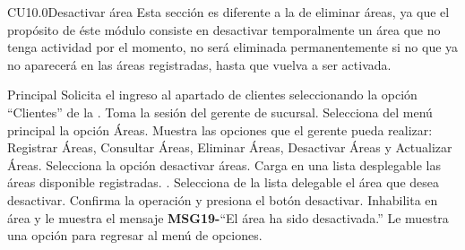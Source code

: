 

	\begin{UseCase}{CU10.0}{Desactivar área}{
		Esta sección es diferente a la de eliminar áreas, ya que el propósito de éste módulo consiste en desactivar temporalmente un área que no tenga actividad por el momento, no será eliminada permanentemente si no que ya no aparecerá en las áreas registradas, hasta que vuelva a ser activada.
	}




	\end{UseCase}

\begin{UCtrayectoria}{Principal}
		\UCpaso[\UCactor] Solicita el ingreso al apartado de clientes seleccionando la opción ``Clientes'' de la .
		\UCpaso Toma la sesión del gerente de sucursal.
		\UCpaso[\UCactor] Selecciona del menú principal la opción Áreas.
		\UCpaso Muestra las opciones que el gerente pueda realizar: Registrar Áreas, Consultar Áreas, Eliminar Áreas, Desactivar Áreas y Actualizar Áreas.
		\UCpaso[\UCactor] Selecciona la opción desactivar áreas.
		\UCpaso Carga en una lista desplegable las áreas disponible registradas. .
		\UCpaso[\UCactor] Selecciona de la lista delegable el área que desea desactivar.
		\UCpaso[\UCactor] Confirma la operación y presiona el botón desactivar.
		\UCpaso Inhabilita en área y le muestra el mensaje {\bf MSG19-}``El área ha sido desactivada.''
		\UCpaso Le muestra una opción para regresar al menú de opciones.
	\end{UCtrayectoria}

